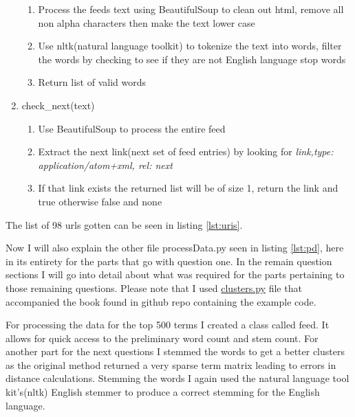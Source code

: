 \documentclass[letterpaper,10pt]{article}
\begin{document}
\begin{enumerate}
\begin{enumerate}
\item Process the feeds text using BeautifulSoup to clean out html, remove all non alpha characters then make the text lower case
\item Use nltk(natural language toolkit) to tokenize the text into words, filter the words by checking to see if they are not English language stop words
\item Return list of valid words
\end{enumerate}
\item check\_next(text)
\begin{enumerate}
\item Use BeautifulSoup to process the entire feed
\item Extract the next link(next set of feed entries) by looking for \emph{link,type: application/atom+xml, rel: next}
\item If that link exists the returned list will be of size 1, return the link and true otherwise false and none 
\end{enumerate}
\end{enumerate}

The list of 98 urls gotten can be seen in listing \hyperref[lst:uris]{\ref{lst:uris}}.

Now I will also explain the other file processData.py seen in listing \hyperref[lst:pd]{\ref{lst:pd}}, here in its entirety for the parts that go with question one. In the remain question sections I will go into detail about what was required for the parts pertaining to those remaining questions. Please note that I used \href{https://github.com/cataska/programming-collective-intelligence-code/blob/master/chapter3/clusters.py}{clusters.py} file that accompanied the book found in github repo containing the example code. 

For processing the data for the top 500 terms I created a class called feed. It allows for quick access to the preliminary word count and stem count. For another part for the next questions I stemmed the words to get a better clusters as the original method returned a very sparse term matrix leading to errors in distance calculations. Stemming the words I again used the natural language tool kit's(nltk) English stemmer to produce a correct stemming for the English language. 
\end{document}

